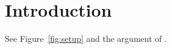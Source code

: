 \documentclass{article}
\begin{document}
\section{Introduction}
See Figure~\ref{fig:setup} and the argument of \cite{knuth1984}.


\end{document}

